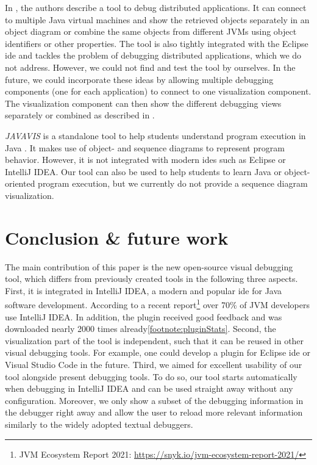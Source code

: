 \documentclass[conference]{IEEEtran}
\newcommand{\intellij}{IntelliJ IDEA}
\begin{document}
In \cite{kochGraphicalDebuggingDistributed2015}, the authors describe a tool to debug distributed applications.
It can connect to multiple Java virtual machines and show the retrieved objects separately in an object diagram or combine the same objects from different JVMs using object identifiers or other properties.
The tool is also tightly integrated with the Eclipse \gls*{ide} and tackles the problem of debugging distributed applications, which we do not address.
However, we could not find and test the tool by ourselves.
In the future, we could incorporate these ideas by allowing multiple debugging components (one for each application) to connect to one visualization component.
The visualization component can then show the different debugging views separately or combined as described in \cite{kochGraphicalDebuggingDistributed2015}.

\textit{JAVAVIS} is a standalone tool to help students understand program execution in Java \cite{oechsleJAVAVISAutomaticProgram2002}.
It makes use of object- and sequence diagrams to represent program behavior.
However, it is not integrated with modern \glspl*{ide} such as Eclipse or \intellij{}.
Our tool can also be used to help students to learn Java or object-oriented program execution, but we currently do not provide a sequence diagram visualization.

\section{Conclusion \& future work} \label{sec:conclusion}
The main contribution of this paper is the new open-source visual debugging tool, which differs from previously created tools in the following three aspects.
First, it is integrated in \intellij{}, a modern and popular \gls*{ide} for Java software development.
According to a recent report\footnote{JVM Ecosystem Report 2021: \url{https://snyk.io/jvm-ecosystem-report-2021/}} over 70\% of JVM developers use \intellij{}.
In addition, the plugin received good feedback and was downloaded nearly 2000 times already\cref{footnote:pluginStats}.
Second, the visualization part of the tool is independent, such that it can be reused in other visual debugging tools.
For example, one could develop a plugin for Eclipse \gls*{ide} or Visual Studio Code in the future.
Third, we aimed for excellent usability of our tool alongside present debugging tools.
To do so, our tool starts automatically when debugging in \intellij{} and can be used straight away without any configuration.
Moreover, we only show a subset of the debugging information in the debugger right away and allow the user to reload more relevant information similarly to the widely adopted textual debuggers.
\end{document}
